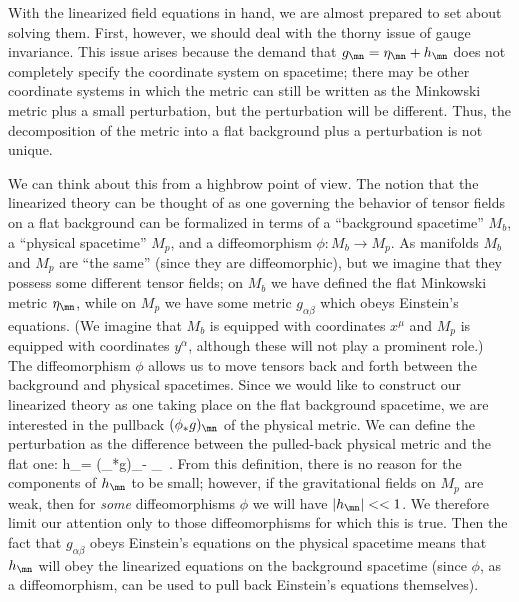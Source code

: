 With the linearized field equations in hand, we are almost prepared
to set about solving them.  First, however, we should deal with the
thorny issue of gauge invariance.  This issue arises because the
demand that $g_\mn=\eta_\mn+h_\mn$ does not completely specify the
coordinate system on spacetime; there may be other coordinate systems
in which the metric can still be written as the Minkowski metric
plus a small perturbation, but the perturbation will be different.  
Thus, the decomposition of the metric into a flat background plus a
perturbation is not unique.

We can think about this from a highbrow point of view.  The notion
that the linearized theory can be thought of as one governing the
behavior of tensor fields on a flat background can be formalized in
terms of a ``background spacetime'' $M_b$, a ``physical spacetime''
$M_p$, and a diffeomorphism $\phi:M_b\rightarrow M_p$.  As manifolds
$M_b$ and $M_p$ are ``the same'' (since they are diffeomorphic), but
we imagine that they possess some different tensor fields;
on $M_b$ we have defined the flat Minkowski metric $\eta_\mn$, while
on $M_p$ we have some metric $g_{\alpha\beta}$ which obeys Einstein's
equations.  (We imagine that $M_b$ is equipped with coordinates
$x^\mu$ and $M_p$ is equipped with coordinates $y^\alpha$, although
these will not play a prominent role.)
The diffeomorphism $\phi$ allows us to move tensors back
and forth between the background and physical spacetimes.  Since we
would like to construct our linearized theory as one taking place 
on the flat background spacetime, we are interested in the pullback
$(\phi_*g)_\mn$ of the physical metric.  We can define the perturbation
as the difference between the pulled-back physical metric and the
flat one:
\be
  h_\mn = (\phi_*g)_\mn - \eta_\mn\ .\label{6.10}
\ee
From this definition, there is no reason for the components of $h_\mn$
to be small; however, if the gravitational fields on $M_p$ are weak,
then for {\it some} diffeomorphisms $\phi$ we will have $|h_\mn| << 1$.
We therefore limit our attention only to those diffeomorphisms for which
this is true.  Then the fact that $g_{\alpha\beta}$ obeys Einstein's
equations on the physical spacetime means that $h_\mn$ will obey
the linearized equations on the background spacetime (since $\phi$,
as a diffeomorphism, can be used to pull back Einstein's equations
themselves).

\begin{figure}[h]
  \centerline{
  }
\end{figure}

